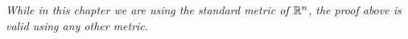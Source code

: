 \begin{oss}
	{\em While in this chapter we are using the standard metric of $\mathbb{R}^n$, the proof above is valid using any other metric.}
\end{oss}

